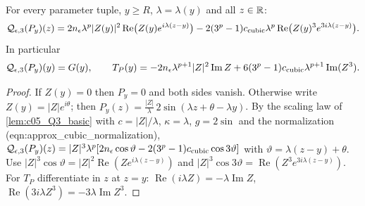 \begin{lemma}
  \label{lem:c05_plane_wave_response}
  For every parameter tuple, $y\ge R$, $\lambda=\lambda(y)$ and all $z\in\mathbb{R}$:
  \begin{equation}\label{eqn:approx_cubic_plane_wave_response}
    \mathcal{Q}_{\epsilon,3}(P_y)(z)=2n_\epsilon\lambda^p|Z(y)|^2\operatorname{Re}\bigl(Z(y)e^{i\lambda(z-y)}\bigr)
    -2(3^p-1)c_{\textup{cubic}}\lambda^p\operatorname{Re}\bigl(Z(y)^3e^{3i\lambda(z-y)}\bigr).
  \end{equation}
  In particular
  \begin{equation}\label{eqn:approx_cubic_plane_wave_frozen}
    \mathcal{Q}_{\epsilon,3}(P_y)(y)=G(y),\qquad T_P(y)=-2n_\epsilon\lambda^{p+1}|Z|^2\operatorname{Im}Z+6(3^p-1)c_{\textup{cubic}}\lambda^{p+1}\operatorname{Im}(Z^3).
  \end{equation}
\end{lemma}
\begin{proof}
  If $Z(y)=0$ then $P_y=0$ and both sides vanish. Otherwise write $Z(y)=|Z|e^{i\theta}$; then
  $P_y(z)=\frac{|Z|}{\lambda}\,2\sin(\lambda z+\theta-\lambda y)$. By the scaling law of \cref{lem:c05_Q3_basic} with
  $c=|Z|/\lambda$, $\kappa=\lambda$, $g=2\sin$ and the normalization (eqn:approx\_cubic\_normalization),
  $\mathcal{Q}_{\epsilon,3}(P_y)(z)=|Z|^3\lambda^p[2n_\epsilon\cos\vartheta-2(3^p-1)c_{\textup{cubic}}\cos3\vartheta]$ with
  $\vartheta=\lambda(z-y)+\theta$. Use $|Z|^3\cos\vartheta=|Z|^2\operatorname{Re}(Ze^{i\lambda(z-y)})$ and
  $|Z|^3\cos3\vartheta=\operatorname{Re}(Z^3e^{3i\lambda(z-y)})$. For $T_P$ differentiate in $z$ at $z=y$:
  $\operatorname{Re}(i\lambda Z)=-\lambda\operatorname{Im}Z$, $\operatorname{Re}(3i\lambda Z^3)=-3\lambda\operatorname{Im}Z^3$.
\end{proof}

